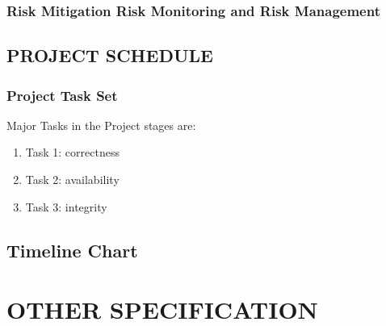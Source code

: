 \documentclass[12pt]{report}
\begin{document}
\subsubsection{Risk Mitigation Risk Monitoring and Risk Management}
\justifying
\setlength{\parindent}{4em}
\setlength{\parskip}{0.5em}
\renewcommand{\baselinestretch}{1.5}

\normalsize
\vspace{1cm}

\vspace{14cm}
\subsection{PROJECT SCHEDULE}

\justifying
\setlength{\parindent}{4em}
\setlength{\parskip}{0.5em}
\renewcommand{\baselinestretch}{1.5}
\subsubsection{Project Task Set}
\normalsize
Major Tasks in the Project stages are:
\begin{enumerate}
\item Task 1: correctness
\item Task 2: availability
\item Task 3: integrity
\end{enumerate}
\vspace{0.1cm}


\vspace{14cm}
\subsection{Timeline Chart}
\justifying
\setlength{\parindent}{4em}
\setlength{\parskip}{0.5em}
\renewcommand{\baselinestretch}{1.5}

\vspace{1cm}











\clearpage


\centering
\section{OTHER SPECIFICATION}

\justifying
\setlength{\parindent}{4em}
\setlength{\parskip}{0.5em}
\renewcommand{\baselinestretch}{1.5}
\end{document}
